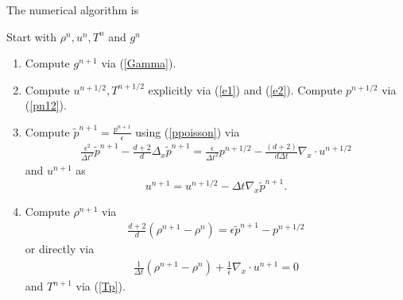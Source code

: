 \documentclass[final,11pt]{siamart251216}
\numberwithin{equation}{section}
\theoremstyle{definition}
\theoremstyle{remark}
\begin{document}
The numerical algorithm is 
\begin{algorithm}\caption{AP algorithm, first-order time discretization}
	Start with $\rho^n,u^n,T^n$ and $g^{n}$ 
	\begin{enumerate}
		\item Compute $g^{n+1}$  via (\ref{Gamma}).
		\item Compute
		$u^{n+1/2}, T^{n+1/2}$ explicitly via 	(\ref{e1}) and (\ref{e2}).
		Compute $p^{n+1/2}$ via (\ref{pn12}).
		\item Compute  $\tilde  p^{n+1}=\frac{p^{n+1}}{\epsilon}$ using (\ref{ppoisson})  via 
		\begin{eqnarray}
		\frac{\epsilon^2}{\Delta t^2} \tilde p^{n+1}- \frac{d+2}{d}\Delta_x  \tilde p^{n+1}  = \frac{\epsilon}{\Delta t^2} p^{n+1/2}   - \frac{(d+2) }{d \Delta t } \nabla_x \cdot u^{n+1/2}
		\end{eqnarray}
		and $u^{n+1} $ as %
		$$u^{n+1}= u^{n+1/2}- \Delta t \nabla_x  \tilde p^{n+1}.$$
		\item 
		Compute  $\rho^{n+1}$ via 
		\begin{eqnarray}
		\frac{d+2}{d} (\rho^{n+1}- \rho^{n})=\epsilon \tilde p^{n+1}- p^{n+1/2}
		\end{eqnarray}
		or directly via
		\begin{eqnarray}
		\frac{1}{\Delta t } (\rho^{n+1}- \rho^{n})+\frac{1}{\epsilon} \nabla_x \cdot u^{n+1}=0
		\end{eqnarray}
		and 
		$ T^{n+1}$ via  (\ref{Tp}).
	\end{enumerate}	
\end{algorithm}
\end{document}
